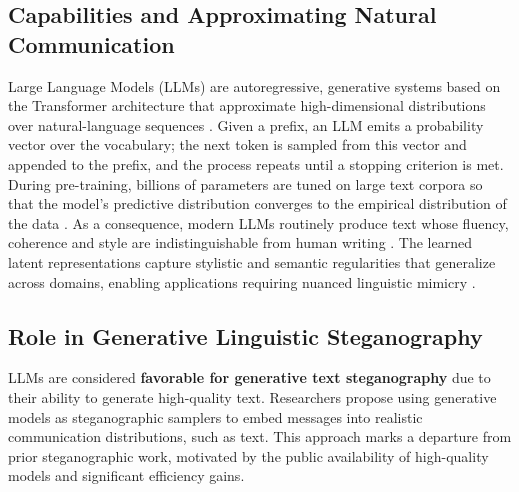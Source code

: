 \label{sec:llm_approaches}

\subsection{Capabilities and Approximating Natural Communication}
Large Language Models (LLMs) are autoregressive, generative systems based on the Transformer architecture \cite{vaswani2017attention} that approximate high-dimensional distributions over natural-language sequences \cite{kaptchuk2021meteor}\cite{radford2019language}.
Given a prefix, an LLM emits a probability vector over the vocabulary; the next token is sampled from this vector and appended to the prefix, and the process repeats until a stopping criterion is met.
During pre-training, billions of parameters are tuned on large text corpora so that the model’s predictive distribution converges to the empirical distribution of the data \cite{brown2020language}.
As a consequence, modern LLMs routinely produce text whose fluency, coherence and style are indistinguishable from human writing \cite{bubeck2023sparks}. The learned latent representations capture stylistic and semantic regularities that generalize across domains, enabling applications requiring nuanced linguistic mimicry \cite{reif2022recipe}.


\subsection{Role in Generative Linguistic Steganography}

LLMs are considered \textbf{favorable for generative text steganography} due to their ability to generate high-quality text.
Researchers propose using generative models as steganographic samplers to embed messages into realistic communication distributions, such as text. This approach marks a departure from prior steganographic work, motivated by the public availability of high-quality models and significant efficiency gains.

